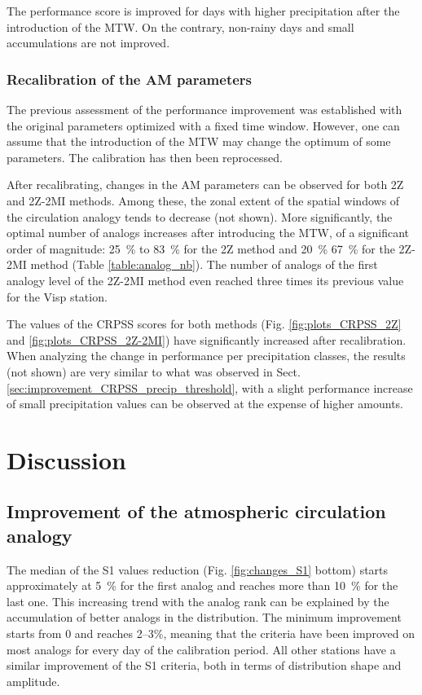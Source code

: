 \documentclass[hess, manuscript]{copernicus}
\begin{document}
The performance score is improved for days with higher precipitation after the introduction of the MTW. On the contrary, non-rainy days and small accumulations are not improved.


\subsubsection{Recalibration of the AM parameters}
\label{sec:recalibration}

The previous assessment of the performance improvement was established with the original parameters optimized with a fixed time window. However, one can assume that the introduction of the MTW may change the optimum of some parameters. The calibration has then been reprocessed.

After recalibrating, changes in the AM parameters can be observed for both 2Z and 2Z-2MI methods. Among these, the zonal extent of the spatial windows of the circulation analogy tends to decrease (not shown). More significantly, the optimal number of analogs increases after introducing the MTW, of a significant order of magnitude: 25~\% to 83~\% for the 2Z method and 20~\% 67~\% for the 2Z-2MI method (Table \ref{table:analog_nb}). The number of analogs of the first analogy level of the 2Z-2MI method even reached three times its previous value for the Visp station. 

The values of the CRPSS scores for both methods (Fig. \ref{fig:plots_CRPSS_2Z} and \ref{fig:plots_CRPSS_2Z-2MI}) have significantly increased after recalibration. When analyzing the change in performance per precipitation classes, the results (not shown) are very similar to what was observed in Sect. \ref{sec:improvement_CRPSS_precip_threshold}, with a slight performance increase of small precipitation values can be observed at the expense of higher amounts.


\section{Discussion}
\label{sec:discussion}


\subsection{Improvement of the atmospheric circulation analogy}

The median of the S1 values reduction (Fig. \ref{fig:changes_S1} bottom) starts approximately at 5~\% for the first analog and reaches more than 10~\% for the last one. This increasing trend with the analog rank can be explained by the accumulation of better analogs in the distribution. The minimum improvement starts from 0 and reaches 2--3\%, meaning that the criteria have been improved on most analogs for every day of the calibration period. All other stations have a similar improvement of the S1 criteria, both in terms of distribution shape and amplitude.
\end{document}

